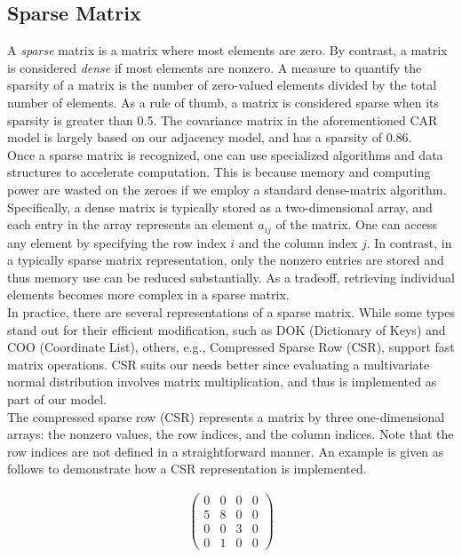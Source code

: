 \nonumber
\subsection{Sparse Matrix}\label{subsec:sparse}

A \emph{sparse} matrix is a matrix where most elements are zero.
By contrast, a matrix is considered \emph{dense} if most elements are nonzero.
A measure to quantify the sparsity of a matrix is the number of zero-valued elements divided by the total number of elements.
As a rule of thumb, a matrix is considered sparse when its sparsity is greater than 0.5. The covariance matrix in the aforementioned CAR model is largely based on our adjacency model, and has a sparsity of 0.86.\\

Once a sparse matrix is recognized, one can use specialized algorithms and data structures to accelerate computation.
This is because memory and computing power are wasted on the zeroes if we employ a standard dense-matrix algorithm.
Specifically, a dense matrix is typically stored as a two-dimensional array, and each entry in the array represents an element $ a_{ij}$ of the matrix.
One can access any element by specifying the row index $i$ and the column index $j$.
In contrast, in a typically sparse matrix representation, only the nonzero entries are stored and thus memory use can be reduced substantially.
As a tradeoff, retrieving individual elements becomes more complex in a sparse matrix.\\

In practice, there are several representations of a sparse matrix.
While some types stand out for their efficient modification, such as DOK (Dictionary of Keys) and COO (Coordinate List), others, e.g., Compressed Sparse Row (CSR), support fast matrix operations.
CSR suits our needs better since evaluating a multivariate normal distribution involves matrix multiplication, and thus is implemented as part of our model. \\

The compressed sparse row (CSR) represents a matrix by three one-dimensional arrays: the nonzero values, the row indices, and the column indices.
Note that the row indices are not defined in a straightforward manner.
An example is given as follows to demonstrate how a CSR representation is implemented.

\begin{align*}
\left(
\begin{matrix}
  0 & 0 & 0 & 0 \\
  5 & 8 & 0 & 0 \\
  0 & 0 & 3 & 0 \\
  0 & 1 & 0 & 0
\end{matrix}
\right)
\end{align*}

